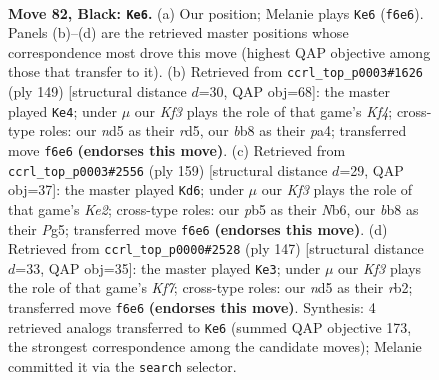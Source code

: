 \documentclass[11pt]{article}
\begin{document}
\clearpage

\begin{figure}[p]\centering
\begin{subfigure}{0.46\textwidth}\centering
\resizebox{\linewidth}{!}{%
\newchessgame
\chessboard[
  setfen={1Bb5/8/5k2/1P1N4/P3B3/2K4p/1R6/6r1 b - - 4 82},
  showmover=false,
  pgfstyle=straightmove, color=movearrow, markmove={f6-e6}
]}
\caption{}
\end{subfigure}\hfill
\begin{subfigure}{0.46\textwidth}\centering
\resizebox{\linewidth}{!}{%
\newchessgame
\chessboard[
  setfen={8/2B5/p7/2KR1k2/P7/7r/4b3/8 b - - 6 75},
  showmover=false,
  pgfstyle=straightmove, color=movearrow, markmove={f5-e4}
]}
\caption{}
\end{subfigure}
\\[4pt]
\begin{subfigure}{0.46\textwidth}\centering
\resizebox{\linewidth}{!}{%
\newchessgame
\chessboard[
  setfen={8/4k3/1n6/1P3Bp1/3r4/4R1KP/8/8 b - - 9 80},
  showmover=false,
  pgfstyle=straightmove, color=movearrow, markmove={e7-d6}
]}
\caption{}
\end{subfigure}\hfill
\begin{subfigure}{0.46\textwidth}\centering
\resizebox{\linewidth}{!}{%
\newchessgame
\chessboard[
  setfen={8/2r2p2/8/1K3Bb1/6P1/8/1R3k2/8 b - - 9 74},
  showmover=false,
  pgfstyle=straightmove, color=movearrow, markmove={f2-e3}
]}
\caption{}
\end{subfigure}
\caption{\textbf{Move 82, Black: \texttt{Ke6}.} (a) Our position; Melanie plays \texttt{Ke6} (\texttt{f6e6}). Panels (b)--(d) are the retrieved master positions whose correspondence most drove this move (highest QAP objective among those that transfer to it). (b) Retrieved from \texttt{ccrl\_top\_p0003\#1626} (ply 149) [structural distance $d$=30, QAP obj=68]: the master played \texttt{Ke4}; under $\mu$ our \emph{Kf3} plays the role of that game's \emph{Kf4}; cross-type roles: our \emph{n}d5 as their \emph{r}d5, our \emph{b}b8 as their \emph{p}a4; transferred move \texttt{f6e6} \textbf{(endorses this move)}. (c) Retrieved from \texttt{ccrl\_top\_p0003\#2556} (ply 159) [structural distance $d$=29, QAP obj=37]: the master played \texttt{Kd6}; under $\mu$ our \emph{Kf3} plays the role of that game's \emph{Ke2}; cross-type roles: our \emph{p}b5 as their \emph{N}b6, our \emph{b}b8 as their \emph{P}g5; transferred move \texttt{f6e6} \textbf{(endorses this move)}. (d) Retrieved from \texttt{ccrl\_top\_p0000\#2528} (ply 147) [structural distance $d$=33, QAP obj=35]: the master played \texttt{Ke3}; under $\mu$ our \emph{Kf3} plays the role of that game's \emph{Kf7}; cross-type roles: our \emph{n}d5 as their \emph{r}b2; transferred move \texttt{f6e6} \textbf{(endorses this move)}. Synthesis: 4 retrieved analogs transferred to \texttt{Ke6} (summed QAP objective 173, the strongest correspondence among the candidate moves); Melanie committed it via the \texttt{search} selector.}
\label{fig:thought-m163}
\end{figure}
\end{document}
